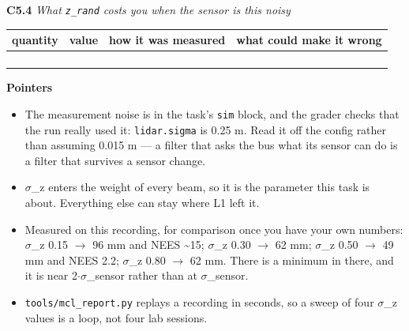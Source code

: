 \documentclass[a4paper,10pt]{article}
\begin{document}
\vspace{4pt}\noindent\textbf{C5.4} \emph{What \texttt{z\_rand} costs you when the sensor is this noisy}

\begin{tabular}{|>{\raggedright\hyphenpenalty 500\arraybackslash}p{4.29cm}|>{\raggedright\hyphenpenalty 500\arraybackslash}p{2.95cm}|>{\raggedright\hyphenpenalty 500\arraybackslash}p{4.29cm}|>{\raggedright\hyphenpenalty 500\arraybackslash}p{2.95cm}|}
\hline
\textbf{quantity} & \textbf{value} & \textbf{how it was measured} & \textbf{what could make it wrong} \\
\hline
\rule{0pt}{2.4em} & \rule{0pt}{2.4em} & \rule{0pt}{2.4em} & \rule{0pt}{2.4em} \\
\rule{0pt}{2.4em} & \rule{0pt}{2.4em} & \rule{0pt}{2.4em} & \rule{0pt}{2.4em} \\
\rule{0pt}{2.4em} & \rule{0pt}{2.4em} & \rule{0pt}{2.4em} & \rule{0pt}{2.4em} \\
\rule{0pt}{2.4em} & \rule{0pt}{2.4em} & \rule{0pt}{2.4em} & \rule{0pt}{2.4em} \\
\hline
\end{tabular}

\vspace{4pt}\noindent\textbf{Pointers}

\begin{itemize}\itemsep1pt

\item The measurement noise is in the task's \texttt{sim} block, and the grader checks that the run really used it: \texttt{lidar.sigma} is 0.25 m. Read it off the config rather than assuming 0.015 m --- a filter that asks the bus what its sensor can do is a filter that survives a sensor change.

\item \(\sigma\)\_z enters the weight of every beam, so it is the parameter this task is about. Everything else can stay where L1 left it.

\item Measured on this recording, for comparison once you have your own numbers: \(\sigma\)\_z 0.15 \(\rightarrow\) 96 mm and NEES \textasciitilde{}15; \(\sigma\)\_z 0.30 \(\rightarrow\) 62 mm; \(\sigma\)\_z 0.50 \(\rightarrow\) 49 mm and NEES 2.2; \(\sigma\)\_z 0.80 \(\rightarrow\) 62 mm. There is a minimum in there, and it is near 2\(\cdot\)\(\sigma\)\_sensor rather than at \(\sigma\)\_sensor.

\item \texttt{tools/mcl\_report.py} replays a recording in seconds, so a sweep of four \(\sigma\)\_z values is a loop, not four lab sessions.

\end{itemize}
\end{document}
